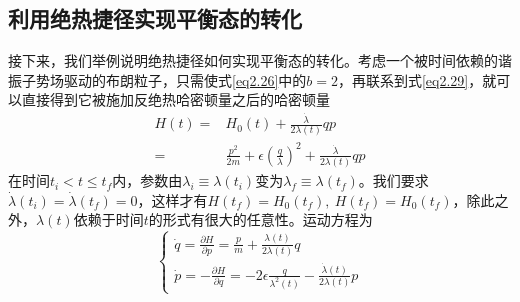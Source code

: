 \subsection{利用绝热捷径实现平衡态的转化}
\qquad 接下来，我们举例说明绝热捷径如何实现平衡态的转化。\cite{Tu2013}考虑一个被时间依赖的谐振子势场驱动的布朗粒子，只需使式\eqref{eq2.26}中的$b=2$，再联系到式\eqref{eq2.29}，就可以直接得到它被施加反绝热哈密顿量之后的哈密顿量
\begin{equation}
    \begin{split}
        H(t)=&H_0 (t) + \frac{\dot{\lambda}}{2 \lambda(t)} q p\\
    =&\frac{p^{2}}{2 m}+\epsilon\left(\frac{q}{\lambda}\right)^{2}+\frac{\dot{\lambda}}{2 \lambda(t)} q p
    \end{split}
    \label{eq2.31}
\end{equation}
在时间$t_i < t \leq t_f$内，参数由$\lambda_{i} \equiv \lambda(t_i)$变为$\lambda_{f} \equiv \lambda(t_f)$。我们要求$\dot{\lambda}\left(t_{i}\right)=\dot{\lambda}\left(t_{f}\right)=0$，这样才有$H\left(t_{f}\right)=H_0 \left(t_{f}\right),\ H\left(t_{f}\right)=H_0 \left(t_{f}\right)$，除此之外，$\lambda (t)$依赖于时间$t$的形式有很大的任意性。运动方程为
\begin{equation}
    \left\{\begin{array}{l}
        \dot{q}=\frac{\partial H}{\partial p}=\frac{p}{m}+\frac{\lambda(t)}{2 \lambda(t)} q \\
        \dot{p}=-\frac{\partial H}{\partial q}=-2 \epsilon \frac{q}{\lambda^{2}(t)}-\frac{\dot{\lambda}(t)}{2 \lambda(t)} p
        \end{array}\right.
    \label{eq31.5}
\end{equation}


